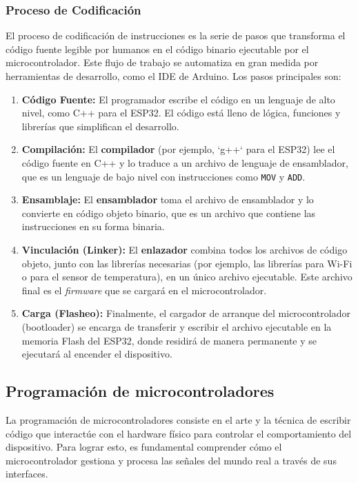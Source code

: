 \documentclass[a4paper,12pt]{article}
\begin{document}
	\subsubsection{Proceso de Codificación}
	El proceso de codificación de instrucciones es la serie de pasos que transforma el código fuente legible por humanos en el código binario ejecutable por el microcontrolador. Este flujo de trabajo se automatiza en gran medida por herramientas de desarrollo, como el IDE de Arduino. Los pasos principales son:
	
	\begin{enumerate}
		\item \textbf{Código Fuente:} El programador escribe el código en un lenguaje de alto nivel, como C++ para el ESP32. El código está lleno de lógica, funciones y librerías que simplifican el desarrollo.
		\item \textbf{Compilación:} El \textbf{compilador} (por ejemplo, `g++` para el ESP32) lee el código fuente en C++ y lo traduce a un archivo de lenguaje de ensamblador, que es un lenguaje de bajo nivel con instrucciones como \texttt{MOV} y \texttt{ADD}.
		\item \textbf{Ensamblaje:} El \textbf{ensamblador} toma el archivo de ensamblador y lo convierte en código objeto binario, que es un archivo que contiene las instrucciones en su forma binaria.
		\item \textbf{Vinculación (Linker):} El \textbf{enlazador} combina todos los archivos de código objeto, junto con las librerías necesarias (por ejemplo, las librerías para Wi-Fi o para el sensor de temperatura), en un único archivo ejecutable. Este archivo final es el \textit{firmware} que se cargará en el microcontrolador.
		\item \textbf{Carga (Flasheo):} Finalmente, el cargador de arranque del microcontrolador (bootloader) se encarga de transferir y escribir el archivo ejecutable en la memoria Flash del ESP32, donde residirá de manera permanente y se ejecutará al encender el dispositivo.
	\end{enumerate}
	
	
	\subsection{Programación de microcontroladores}
	La programación de microcontroladores consiste en el arte y la técnica de escribir código que interactúe con el hardware físico para controlar el comportamiento del dispositivo. Para lograr esto, es fundamental comprender cómo el microcontrolador gestiona y procesa las señales del mundo real a través de sus interfaces.
	
\end{document}
